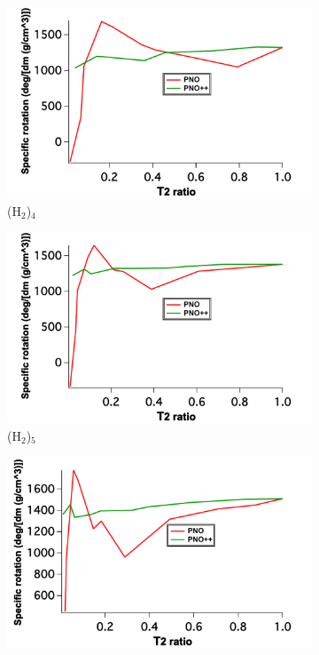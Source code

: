 \begin{figure}
\begin{subfigure}{.5\textwidth}
  \centering
  \includegraphics[width=.9\linewidth]{figures_pno++/pno++_h2_4_adz_optrot_lg.pdf}
  \caption{(H$_2$)$_4$}
  \label{fig:sfig1}
\end{subfigure}%
\begin{subfigure}{.5\textwidth}
  \centering
  \includegraphics[width=.9\linewidth]{figures_pno++/pno++_h2_5_adz_optrot_lg.pdf}
  \caption{(H$_2$)$_5$}
  \label{fig:sfig2}
\end{subfigure}
\begin{subfigure}{.5\textwidth}
  \centering
  \includegraphics[width=.9\linewidth]{figures_pno++/pno++_h2_6_adz_optrot_lg.pdf}

\end{subfigure}
\end{figure}
